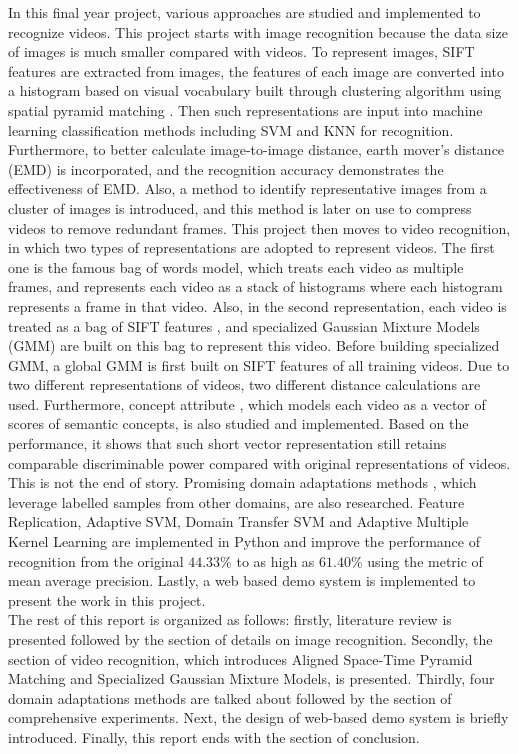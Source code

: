 \noindent In this final year project, various approaches are studied and implemented to recognize videos. This project starts with image recognition because the data size of images is much smaller compared with videos. To represent images, SIFT features \cite{lowe2004distinctive} are extracted from images, the features of each image are converted into a histogram based on visual vocabulary built through clustering algorithm using spatial pyramid matching \cite{lazebnik2006beyond}. Then such representations are input into machine learning classification methods including SVM and KNN for recognition. Furthermore, to better calculate image-to-image distance, earth mover's distance (EMD) \cite{rubner2000earth} is incorporated, and the recognition accuracy demonstrates the effectiveness of EMD. Also, a method to identify representative images from a cluster of images is introduced, and this method is later on use to compress videos to remove redundant frames. This project then moves to video recognition, in which two types of representations are adopted to represent videos. The first one is the famous bag of words model, which treats each video as multiple frames, and represents each video as a stack of histograms \cite{duan2012visual} where each histogram represents a frame in that video. Also, in the second representation, each video is treated as a bag of SIFT features \cite{zhou2008sift}, and specialized Gaussian Mixture Models (GMM) are built on this bag to represent this video. Before building specialized GMM, a global GMM is first built on SIFT features of all training videos. Due to two different representations of videos, two different distance calculations are used. Furthermore, concept attribute \cite{liu2013video}, which models each video as a vector of scores of semantic concepts, is also studied and implemented. Based on the performance, it shows that such short vector representation still retains comparable discriminable power compared with original representations of videos. This is not the end of story. Promising domain adaptations methods \cite{duan2012visual, duan2009domain, yang2007cross, daume2007frustratingly}, which leverage labelled samples from other domains, are also researched. Feature Replication, Adaptive SVM, Domain Transfer SVM and Adaptive Multiple Kernel Learning are implemented in Python and improve the performance of recognition from the original $44.33\%$ to as high as $61.40\%$ using the metric of mean average precision. Lastly, a web based demo system is implemented to present the work in this project. \\

\noindent The rest of this report is organized as follows: firstly, literature review is presented followed by the section of details on image recognition. Secondly, the section of video recognition, which introduces Aligned Space-Time Pyramid Matching and Specialized Gaussian Mixture Models, is presented. Thirdly, four domain adaptations methods are talked about followed by the section of comprehensive experiments. Next, the design of web-based demo system is briefly introduced. Finally, this report ends with the section of conclusion. 